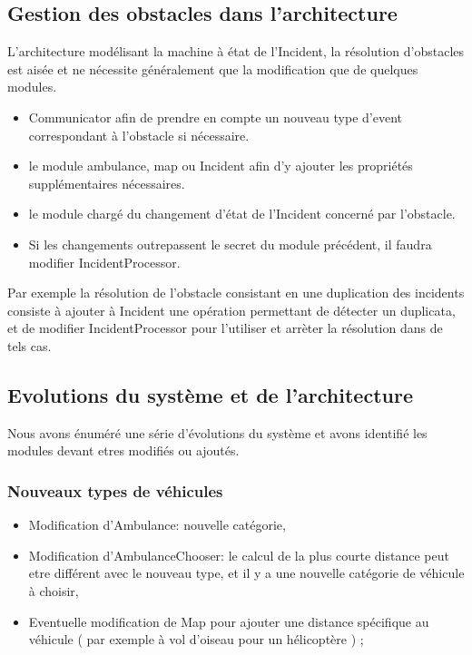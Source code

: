 \subsection{Gestion des obstacles dans l'architecture}
	L'architecture modélisant la machine à état de l'Incident, 
	la résolution d'obstacles est aisée et ne nécessite généralement
	que la modification que de quelques modules.
	\begin{itemize}
		\item Communicator afin de prendre en compte un nouveau type
		 	d'event correspondant à l'obstacle si nécessaire.
		\item le module ambulance, map ou Incident afin d'y ajouter
			les propriétés supplémentaires nécessaires.
		\item le module chargé du changement d'état de l'Incident 
		      concerné par l'obstacle.
		\item Si les changements outrepassent le secret du module
			précédent, il faudra modifier IncidentProcessor.
	\end{itemize}
	
	Par exemple la résolution de l'obstacle consistant en une duplication
	des incidents consiste à ajouter à Incident une opération permettant
	de détecter un duplicata, et de modifier IncidentProcessor pour
	l'utiliser et arrèter la résolution dans de tels cas.

\subsection{Evolutions du système et de l'architecture}
	Nous avons énuméré une série d'évolutions du système et avons
	identifié les modules devant etres modifiés ou ajoutés.
	\subsubsection{Nouveaux types de véhicules}
		\begin{itemize}
			\item Modification d'Ambulance: nouvelle catégorie,
			\item Modification d'AmbulanceChooser: le calcul de la plus courte
				distance peut etre différent avec le nouveau type, et il
				y a une nouvelle catégorie de véhicule à choisir,
			\item Eventuelle modification de Map pour ajouter une distance 
			      spécifique au véhicule ( par exemple à vol d'oiseau pour un
			      hélicoptère ) ;
		\end{itemize}

